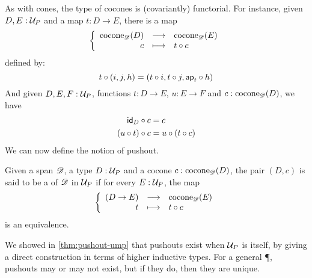 As with cones, the type of cocones is (covariantly) functorial.
For instance, given $D,E:\P$ and a map $t:D\to{}E$, there is a map
  \[\function{\cocone{\Ddiag}{D}}{\cocone{\Ddiag}{E}}{c}{\composecocone{t}c}\]
  defined by:
  \[\composecocone{t}(i,j,h)=(t\circ{}i,t\circ{}j,\mapfunc{t}\circ{}h)\]
And given $D,E,F:\P$, functions $t:D\to{}E$, $u:E\to{}F$ and $c:\cocone{\Ddiag}{D}$, we have
\begin{align*}
  \composecocone{\idfunc[D]}c &= c\\
  \composecocone{(u\circ{}t)}c&=\composecocone{u}(\composecocone{t}c)
\end{align*}
We can now define the notion of pushout.

\begin{defn}
  Given a span $\Ddiag$, a type $D:\P$ and a cocone
  $c:\cocone{\Ddiag}{D}$, the pair $(D,c)$ is said to be a 
  of $\Ddiag$ in $\P$ if for every $E:\P$, the map
  \[\function{(D\to{}E)}{\cocone{\Ddiag}{E}}{t}{\composecocone{t}c}\]
  is an equivalence.
\end{defn}

We showed in \autoref{thm:pushout-ump} that pushouts exist when $\P$ is \type itself, by giving a direct construction in terms of higher
inductive types.
For a general \P, pushouts may or may not exist, but if they do, then they are unique.

